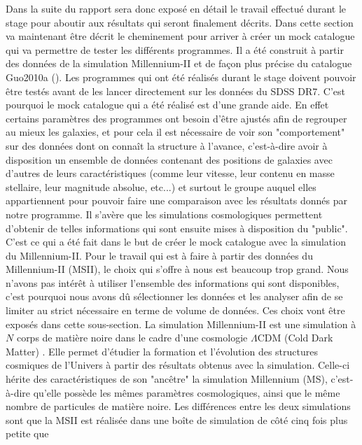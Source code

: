 Dans la suite du rapport sera donc exposé en détail le travail effectué durant le stage pour aboutir aux résultats qui seront
finalement décrits.
\vspace{1em}
Dans cette section va maintenant être décrit le cheminement pour arriver à créer un mock catalogue qui va permettre de tester les
différents programmes. Il a été construit à partir des données de la simulation Millennium-II et de façon plus précise du catalogue
Guo2010a (\citet{Guo+11}).
Les programmes qui ont été réalisés durant le stage doivent pouvoir être testés avant de les lancer directement sur les données du
SDSS DR7. C'est pourquoi le mock catalogue qui a été réalisé est d'une grande aide. En effet certains paramètres des programmes ont
besoin d'être ajustés afin de regrouper au mieux les galaxies, et pour cela il est nécessaire de voir son "comportement" sur des
données dont on connaît la structure à l'avance, c'est-à-dire avoir à disposition un ensemble de données contenant des positions de
galaxies avec d'autres de leurs caractéristiques (comme leur vitesse, leur contenu en masse stellaire, leur magnitude absolue,
etc...) et surtout le groupe auquel elles appartiennent pour pouvoir faire une comparaison avec les résultats donnés par notre
programme. Il s'avère que les simulations cosmologiques permettent d'obtenir de telles informations qui sont ensuite mises à
disposition du "public". C'est ce qui a été fait dans le but de créer le mock catalogue avec la simulation du Millennium-II.
Pour le travail qui est à faire à partir des données du Millennium-II (MSII), le choix qui s'offre à nous est beaucoup trop grand.
Nous n'avons pas intérêt à utiliser l'ensemble des informations qui sont disponibles, c'est pourquoi nous avons dû sélectionner les
données et les analyser afin de se limiter au strict nécessaire en terme de volume de données. Ces choix vont être exposés dans
cette sous-section.
La simulation Millennium-II est une simulation à $N$ corps de matière noire dans le cadre d'une cosmologie $\Lambda$CDM (Cold Dark
Matter) \citet{BoylanKolchin+09}. Elle permet d'étudier la formation et l'évolution des structures cosmiques de l'Univers à partir
des résultats obtenus avec la simulation. Celle-ci hérite des caractéristiques de son "ancêtre" la simulation Millennium (MS),
c'est-à-dire qu'elle possède les mêmes paramètres cosmologiques, ainsi que le même nombre de particules de matière noire. Les
différences entre les deux simulations sont que la MSII est réalisée dans une boîte de simulation de côté cinq fois plus petite que
